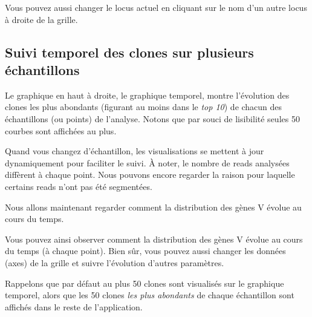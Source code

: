 \documentclass[11pt]{article}
\begin{document}
Vous pouvez aussi changer le locus actuel en cliquant sur le nom d'un
autre locus à droite de la grille.

\subsection{Suivi temporel des clones sur plusieurs échantillons}

Le graphique en haut à droite, le graphique temporel, montre l'évolution des
clones les plus abondants (figurant au moins dans le \textit{top 10}) de chacun des
échantillons (ou points) de l'analyse.
Notons que par souci de lisibilité seules 50 courbes sont affichées au plus.


Quand vous changez d'échantillon, les visualisations se mettent à jour
dynamiquement pour faciliter le suivi. À noter, le nombre de reads
analysées diffèrent à chaque point. Nous pouvons encore
regarder la raison pour laquelle certains reads n'ont pas été segmentées.

\bigskip

Nous allons maintenant regarder comment la distribution des gènes V évolue
au cours du temps.


Vous pouvez ainsi observer comment la distribution des gènes V
évolue au cours du temps (à chaque point). Bien sûr, vous pouvez aussi
changer les données (axes) de la grille et suivre l'évolution
d'autres paramètres.

\bigskip

Rappelons que par défaut au plus 50 clones sont visualisés sur le graphique
temporel, alors que les 50 clones \textit{les plus abondants} de chaque échantillon
sont affichés dans le reste de l'application.

\end{document}
